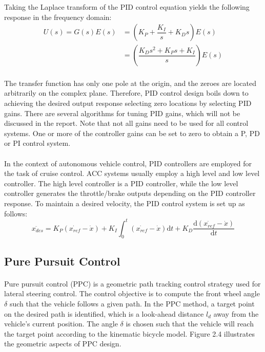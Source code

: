 \noindent Taking the Laplace transform of the PID control equation yields the following response in the frequency domain:
\begin{align*}
    U(s) = G(s)E(s) &= \left(K_P + \dfrac{K_I}{s}+ K_Ds\right)E(s)\\
    &= \left(\dfrac{K_Ds^2 + K_Ps + K_I}{s}\right)E(s)
\end{align*}

\paragraph{}
The transfer function has only one pole at the origin, and the zeroes are located arbitrarily on the complex plane. Therefore, PID control design boils down to achieving the desired output response selecting zero locations by selecting PID gains. There are several algorithms for tuning PID gains, which will not be discussed in the report. Note that not all gains need to be used for all control systems. One or more of the controller gains can be set to zero to obtain a P, PD or PI control system.

\paragraph{}
In the context of autonomous vehicle control, PID controllers are employed for the task of cruise control. ACC systems usually employ a high level and low level controller. The high level controller is a PID controller, while the low level controller generates the throttle/brake outputs depending on the PID controller response. To maintain a desired velocity, the PID control system is set up as follows:
$$\ddot{x_{des}} = K_P(\dot{x_{ref}} - \dot{x}) + K_I\int_0^t(\dot{x_{ref}} - \dot{x})\text{d}t + K_D\dfrac{\text{d}(\dot{x_{ref}} - \dot{x})}{\text{d}t}$$

\subsection{Pure Pursuit Control}
\paragraph{}
Pure pursuit control (PPC) is a geometric path tracking control strategy used for lateral steering control. The control objective is to compute the front wheel angle $\delta$ such that the vehicle follows a given path. In the PPC method, a target point on the desired path is identified, which is a look-ahead distance $l_d$ away from the vehicle's current position. The angle $\delta$ is chosen such that the vehicle will reach the target point according to the kinematic bicycle model. Figure 2.4 illustrates the geometric aspects of PPC design.

